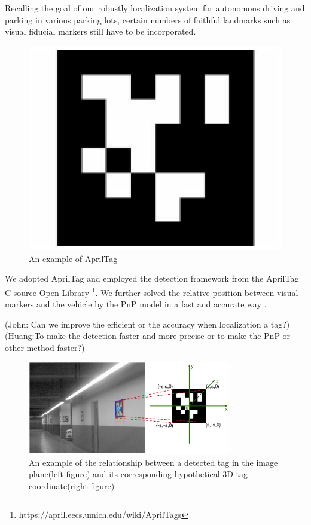 \documentclass[journal]{IEEEtran}
\begin{document}
Recalling the goal of our robustly localization system for autonomous driving and parking in various parking lots, certain numbers of faithful landmarks such as visual fiducial markers still have to be incorporated.

\begin{figure}
\centering
\includegraphics{pic/fig6_Visual_markers}
\caption{An example of AprilTag}\label{fig:6}
\end{figure}

We adopted AprilTag and employed the detection framework from the AprilTag C source Open Library \footnote{https://april.eecs.umich.edu/wiki/AprilTags}\cite{Olson2011AprilTag}.
We further solved the relative position between visual markers and the vehicle by the PnP model in a fast and accurate way \cite{Hartley2003Multiple}. 

(John: Can we improve the efficient or the accuracy when localization a tag?)
(Huang:To make the detection faster and more precise or to make the PnP or other method faster?)

\begin{figure}
\centering
\includegraphics[height = 1.6in]{pic/fig7_Visual_markers}
\caption{
An example of the relationship between a detected tag in the image plane(left figure) and its corresponding hypothetical 3D tag coordinate(right figure)
}\label{fig:7}
\end{figure}
\end{document}
